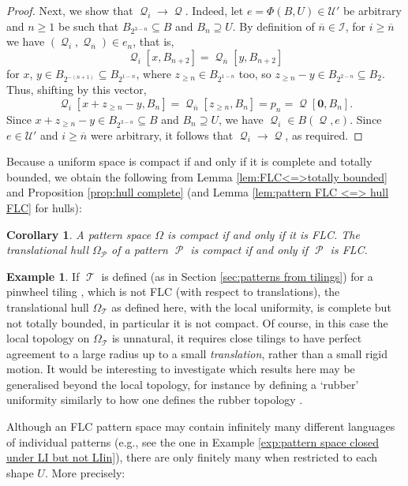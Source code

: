 \documentclass[11pt]{amsart}
\numberwithin{equation}{section}
\theoremstyle{plain}
\newtheorem{corollary}[theorem]{Corollary}
\theoremstyle{definition}
\newtheorem{example}[theorem]{Example}
\DeclareMathOperator{\cP}{\mathcal{P}}
\DeclareMathOperator{\cQ}{\mathcal{Q}}
\DeclareMathOperator{\cT}{\mathcal{T}}
\begin{document}
\begin{proof}
Next, we show that \(\cQ_i \to \cQ\). Indeed, let \(e = \Phi(B,U) \in \mathscr{U}'\) be arbitrary and \(n \geq 1\) be such that \(B_{2^{3-n}} \subseteq B\) and \(B_n \supseteq U\). By definition of \(\overline{n} \in \mathcal{I}\), for \(i \geq \overline{n}\) we have \((\cQ_i,\cQ_{\overline{n}}) \in e_n\), that is, 
\[
\cQ_i[x,B_{n+2}] = \cQ_{\overline{n}}[y,B_{n+2}] 
\]
for \(x\), \(y \in B_{2^{-(n+1)}} \subseteq B_{2^{1-n}}\), where \(z_{\geq n} \in B_{2^{1-n}}\) too, so \(z_{\geq n} - y \in B_{2^{2-n}} \subseteq B_2\). Thus, shifting by this vector,
\[
\cQ_i[x+z_{\geq n}-y,B_n] = \cQ_{\overline{n}}[z_{\geq n},B_n] = p_n = \cQ[\mathbf{0},B_n] .
\]
Since \(x+z_{\geq n}-y \in B_{2^{3-n}} \subseteq B\) and \(B_n \supseteq U\), we have \(\cQ_i \in B(\cQ,e)\). Since \(e \in \mathscr{U}'\) and \(i \geq \overline{n}\) were arbitrary, it follows that \(\cQ_i \to \cQ\), as required.
\end{proof}

Because a uniform space is compact if and only if it is complete and totally bounded, we obtain the following from Lemma \ref{lem:FLC<=>totally bounded} and Proposition \ref{prop:hull complete} (and Lemma \ref{lem:pattern FLC <=> hull FLC} for hulls):

\begin{corollary}\label{cor:cpt<=>FLC}
A pattern space \(\Omega\) is compact if and only if it is FLC. The translational hull \(\Omega_{\cP}\) of a pattern \(\cP\) is compact if and only if \(\cP\) is FLC.
\end{corollary}

\begin{example}\label{exp:pinwheel}
If \(\cT\) is defined (as in Section \ref{sec:patterns from tilings}) for a pinwheel tiling \cite{Rad94}, which is not FLC (with respect to translations), the translational hull \(\Omega_{\cT}\) as defined here, with the local uniformity, is complete but not totally bounded, in particular it is not compact. Of course, in this case the local topology on \(\Omega_{\cT}\) is unnatural, it requires close tilings to have perfect agreement to a large radius up to a small \emph{translation}, rather than a small rigid motion. It would be interesting to investigate which results here may be generalised beyond the local topology, for instance by defining a `rubber' uniformity similarly to how one defines the rubber topology \cite[Remark 5.6]{BG13}.
\end{example}

Although an FLC pattern space may contain infinitely many different languages of individual patterns (e.g., see the one in Example \ref{exp:pattern space closed under LI but not LIin}), there are only finitely many when restricted to each shape \(U\). More precisely:
\end{document}
